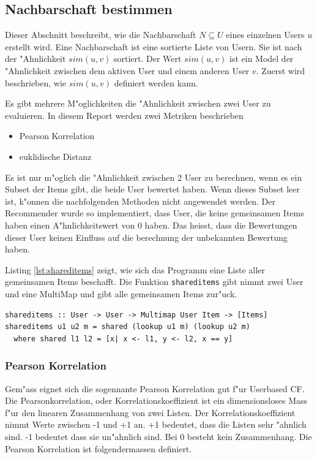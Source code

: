 \documentclass[a4paper, 12pt]{article}
\begin{document}
\subsection{Nachbarschaft bestimmen}
\label{sec:neigborhood}

Dieser Abschnitt beschreibt, wie die Nachbarschaft  $N \subseteq U$ eines einzelnen Users $u$ erstellt wird. Eine Nachbarschaft ist eine sortierte Liste von Usern. Sie ist nach der "Ahnlichkeit $sim(u,v)$ sortiert.  Der Wert $sim(u,v)$ ist ein Model der "Ahnlichkeit zwischen dem aktiven User und einem anderen User $v$. Zuerst wird beschrieben, wie $sim(u,v)$ definiert werden kann.

Es gibt mehrere M"oglichkeiten die "Ahnlichkeit zwischen zwei User zu evaluieren. In diesem Report werden zwei Metriken beschrieben

\begin{itemize}
  \item Pearson Korrelation 
  \item euklidische Distanz
\end{itemize}


Es ist nur m"oglich die "Ahnlichkeit zwischen 2 User zu berechnen, wenn es ein Subset der Items gibt, die beide User bewertet haben. Wenn dieses Subset leer ist, k"onnen die nachfolgenden Methoden nicht angewendet werden. Der Recommender wurde so implementiert, dass User, die keine gemeinsamen Items haben einen A"hnlichkeitswert von 0 haben. Das heisst, dass die Bewertungen dieser User keinen Einfluss auf die berechnung der unbekannten Bewertung haben. 

Listing \ref{lst:shareditems} zeigt, wie sich das Programm eine Liste aller gemeinsamen Items beschafft. Die Funktion \verb|shareditems| gibt nimmt zwei User und eine MultiMap und gibt alle gemeinsamen Items zur"uck. 

\begin{lstlisting}[caption=Implementation von shareditems, label=lst:shareditems]
shareditems :: User -> User -> Multimap User Item -> [Items]
shareditems u1 u2 m = shared (lookup u1 m) (lookup u2 m)
  where shared l1 l2 = [x| x <- l1, y <- l2, x == y]
\end{lstlisting}

\subsubsection{Pearson Korrelation}
\label{sec:pearsoncorrelation}

Gem"ass \cite{jannach11} eignet sich die sogennante Pearson Korrelation gut f"ur Userbased CF. Die Pearsonkorrelation, oder Korrelationskoeffizient ist ein dimensionsloses Mass f"ur den linearen Zusammenhang von zwei Listen. Der Korrelationskoeffizient nimmt Werte zwischen -1 und +1 an. +1 bedeutet, dass die Listen sehr "ahnlich sind. -1 bedeutet dass sie un"ahnlich sind. Bei 0 besteht kein Zusammenhang. Die Pearson Korrelation ist folgendermassen definiert.
\end{document}

